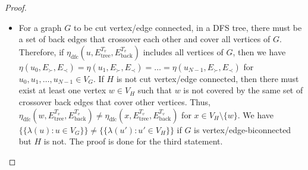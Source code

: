 \begin{proof}
\begin{itemize}
    \item For a graph $G$ to be cut vertex/edge connected, in a DFS tree, there must be a set of back edges that crossover each other and cover all vertices of $G$. Therefore, if $\eta_{\text{dfc}}(u,E_{\text{tree}}^{T_v},E_{\text{back}}^{T_v})$ includes all vertices of $G$, then we have $\eta(u_0,E_{\succ}, E_{\prec}) = \eta(u_1,E_{\succ}, E_{\prec}) = \dots = \eta(u_{N-1},E_{\succ}, E_{\prec})$ for $u_0,u_1,\dots,u_{N-1} \in V_G$. If $H$ is not cut vertex/edge connected, then there must exist at least one vertex $w\in V_H$ such that $w$ is not covered by the same set of crossover back edges that cover other vertices. Thus, 
    $\eta_{\text{dfc}}(w,E_{\text{tree}}^{T_v},E_{\text{back}}^{T_v}) \neq \eta_{\text{dfc}}(x,E_{\text{tree}}^{T_v},E_{\text{back}}^{T_v})$ for $x \in V_H\setminus \{w\}$. We have $\{\!\!\{\lambda(u): u\in V_G\}\!\!\} \neq \{\!\!\{\lambda(u'):u'\in V_H\}\!\!\}$ if $G$ is vertex/edge-biconnected but $H$ is not. The proof is done for the third statement.
    
\end{itemize}
\end{proof}




